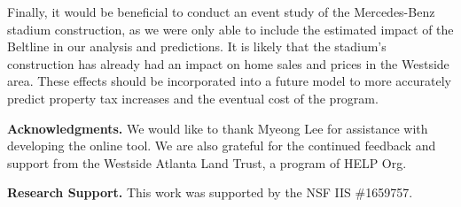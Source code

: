 \documentclass{acm_proc_article-sp}
\begin{document}
Finally, it would be beneficial to conduct an event study of the Mercedes-Benz stadium construction, as we were only able to include the estimated impact of the Beltline in our analysis and predictions. It is likely that the stadium's construction has already had an impact on home sales and prices in the Westside area. These effects should be incorporated into a future model to more accurately predict property tax increases and the eventual cost of the program.

{\bf Acknowledgments.} We would like to thank Myeong Lee for assistance with developing the online tool. We are also grateful for the continued feedback and support from the Westside Atlanta Land Trust, a program of HELP Org. 

{\bf Research Support.} This work was supported by the NSF IIS \#1659757.




\nocite{*}


\end{document}
